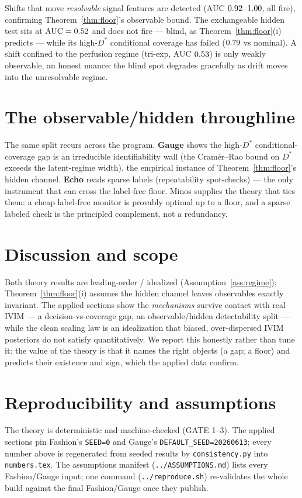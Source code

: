 \documentclass[11pt]{article}
\theoremstyle{definition}
\begin{document}
Shifts that move \emph{resolvable} signal features are detected (AUC $0.92$--$1.00$,
all fire), confirming Theorem~\ref{thm:floor}'s observable bound. The exchangeable hidden test sits at
$\mathrm{AUC}=0.52$ and does not fire --- blind, as Theorem~\ref{thm:floor}(i) predicts ---
while its high-$D^*$ conditional coverage has failed ($0.79$ vs nominal). A shift confined to
the perfusion regime (tri-exp, AUC $0.53$) is only weakly observable, an honest nuance: the
blind spot degrades gracefully as drift moves into the unresolvable regime.

\section{The observable/hidden throughline}\label{sec:thru}
The same split recurs across the program. \textbf{Gauge} shows the high-$D^*$ conditional-coverage gap
is an irreducible identifiability wall (the Cram\'er--Rao bound on $D^*$ exceeds the latent-regime
width), the empirical instance of Theorem~\ref{thm:floor}'s hidden channel. \textbf{Echo} reads sparse
labels (repeatability spot-checks) --- the only instrument that can cross the label-free floor. Minos
supplies the theory that ties them: a cheap label-free monitor is provably optimal up to a floor, and
a sparse labeled check is the principled complement, not a redundancy.

\section{Discussion and scope}\label{sec:disc}
Both theory results are leading-order / idealized (Assumption~\ref{ass:regime}); Theorem~\ref{thm:floor}(i)
assumes the hidden channel leaves observables exactly invariant. The applied sections show the
\emph{mechanisms} survive contact with real IVIM --- a decision-vs-coverage gap, an observable/hidden
detectability split --- while the clean scaling law is an idealization that biased, over-dispersed
IVIM posteriors do not satisfy quantitatively. We report this honestly rather than tune it: the value
of the theory is that it names the right objects (a gap; a floor) and predicts their existence and
sign, which the applied data confirm.

\section{Reproducibility and assumptions}\label{sec:repro}
The theory is deterministic and machine-checked (GATE 1--3). The applied sections pin Fashion's
\texttt{SEED=0} and Gauge's \texttt{DEFAULT\_SEED=20260613}; every number above is regenerated from
seeded results by \texttt{consistency.py} into \texttt{numbers.tex}. The assumptions manifest
(\texttt{../ASSUMPTIONS.md}) lists every Fashion/Gauge input; one command (\texttt{../reproduce.sh})
re-validates the whole build against the final Fashion/Gauge once they publish.
\end{document}
